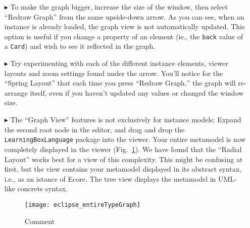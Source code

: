\begin{itemize}
\item[$\blacktriangleright$] To make the graph bigger, increase the size of the window, then select ``Redraw Graph'' from the same upside-down arrow. As you can
see, when an instance is already loaded, the graph view is not automatically updated. This option is useful if you change a property of an element (ie., the
\texttt{back} value of a \texttt{Card}) and wish to see it reflected in the graph.

\item[$\blacktriangleright$] Try experimenting with each of the different instance elements, viewer layouts and zoom settings found under the arrow. You'll
notice for the ``Spring Layout'' that each time you press ``Redraw Graph,'' the graph will re-arrange itself, even if you haven't updated any values or changed the window size.

\item[$\blacktriangleright$] The ``Graph View'' features is not exclusively for instance models; Expand the second root node in the editor, and drag and
drop the \texttt{LearningBoxLanguage} package into the viewer. Your entire metamodel is now completely displayed in the viewer
(Fig.~\ref{fig:graphView_typeGraph}). We have found that the ``Radial Layout'' works best for a view of this complexity. This might be confusing at first, but
the view contains your metamodel displayed in its abstract syntax, i.e., as an istance of Ecore. The tree view displays the metamodel in UML-like concrete
syntax.

\vspace{1cm}

\begin{figure}[htbp]
	\centering
  \texttt{[image: eclipse\_entireTypeGraph]}
	\caption{Comment}
	\label{fig:graphView_typeGraph}
\end{figure}


\end{itemize}
